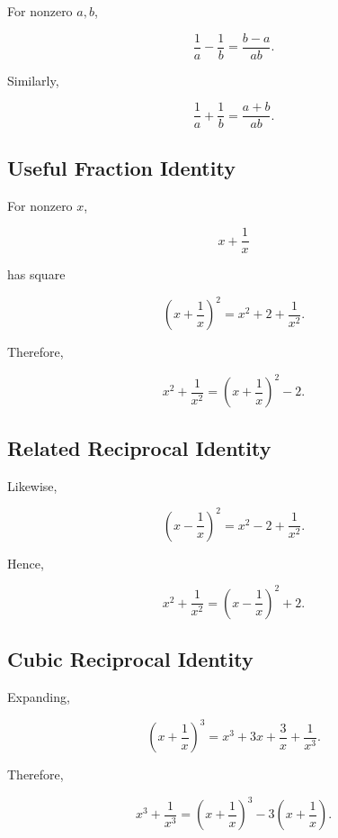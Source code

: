For nonzero \(a,b\),

\[
\boxed{
\frac1a-\frac1b
=
\frac{b-a}{ab}.
}
\]

Similarly,

\[
\boxed{
\frac1a+\frac1b
=
\frac{a+b}{ab}.
}
\]

\subsection{Useful Fraction Identity}
\label{subsec:useful-fraction-identity}

For nonzero \(x\),

\[
\boxed{
x+\frac1x
}
\]

has square

\[
\boxed{
\left(
x+\frac1x
\right)^2
=
x^2+2+\frac1{x^2}.
}
\]

Therefore,

\[
\boxed{
x^2+\frac1{x^2}
=
\left(
x+\frac1x
\right)^2-2.
}
\]

\subsection{Related Reciprocal Identity}
\label{subsec:related-reciprocal-identity}

Likewise,

\[
\boxed{
\left(
x-\frac1x
\right)^2
=
x^2-2+\frac1{x^2}.
}
\]

Hence,

\[
\boxed{
x^2+\frac1{x^2}
=
\left(
x-\frac1x
\right)^2+2.
}
\]

\subsection{Cubic Reciprocal Identity}
\label{subsec:cubic-reciprocal-identity}

Expanding,

\[
\left(
x+\frac1x
\right)^3
=
x^3
+
3x
+
\frac3x
+
\frac1{x^3}.
\]

Therefore,

\[
\boxed{
x^3+\frac1{x^3}
=
\left(
x+\frac1x
\right)^3
-
3
\left(
x+\frac1x
\right).
}
\]

